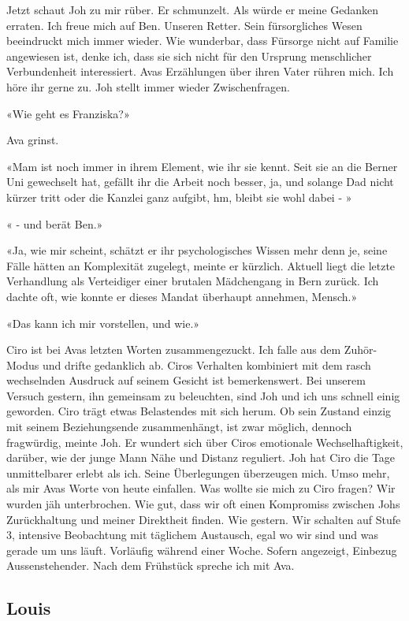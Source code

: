 \sectionbreak

Jetzt schaut Joh zu mir rüber. Er schmunzelt. Als würde er meine
Gedanken erraten.
Ich freue mich auf Ben. Unseren Retter. Sein fürsorgliches Wesen
beeindruckt mich immer wieder. Wie wunderbar, dass Fürsorge nicht auf
Familie angewiesen ist, denke ich, dass sie sich nicht für den Ursprung
menschlicher Verbundenheit interessiert.
Avas Erzählungen über ihren Vater rühren mich. Ich höre ihr gerne zu.
Joh stellt immer wieder Zwischenfragen.

«Wie geht es Franziska?»

Ava grinst.

«Mam ist noch immer in ihrem Element, wie ihr sie kennt. Seit sie an die
Berner Uni gewechselt hat, gefällt ihr die Arbeit noch besser, ja, und
solange Dad nicht kürzer tritt oder die Kanzlei ganz aufgibt, hm, bleibt
sie wohl dabei - »

« - und berät Ben.»

«Ja, wie mir scheint, schätzt er ihr psychologisches Wissen mehr denn
je, seine Fälle hätten an Komplexität zugelegt, meinte er kürzlich.
Aktuell liegt die letzte Verhandlung als Verteidiger einer brutalen
Mädchengang in Bern zurück. Ich dachte oft, wie konnte er dieses Mandat
überhaupt annehmen, Mensch.»

«Das kann ich mir vorstellen, und wie.»

Ciro ist bei Avas letzten Worten zusammengezuckt. Ich falle aus dem
Zuhör-Modus und drifte gedanklich ab. Ciros Verhalten kombiniert mit dem
rasch wechselnden Ausdruck auf seinem Gesicht ist bemerkenswert. Bei
unserem Versuch gestern, ihn gemeinsam zu beleuchten, sind Joh und ich
uns schnell einig geworden. Ciro trägt etwas Belastendes mit sich herum.
Ob sein Zustand einzig mit seinem Beziehungsende zusammenhängt, ist zwar
möglich, dennoch fragwürdig, meinte Joh. Er wundert sich über Ciros
emotionale Wechselhaftigkeit, darüber, wie der junge Mann Nähe und
Distanz reguliert. Joh hat Ciro die Tage unmittelbarer erlebt als ich.
Seine Überlegungen überzeugen mich. Umso mehr, als mir Avas Worte von
heute einfallen. Was wollte sie mich zu Ciro fragen? Wir wurden jäh
unterbrochen.
Wie gut, dass wir oft einen Kompromiss zwischen Johs Zurückhaltung und
meiner Direktheit finden. Wie gestern.
Wir schalten auf Stufe 3, intensive Beobachtung mit täglichem Austausch,
egal wo wir sind und was gerade um uns läuft. Vorläufig während einer
Woche. Sofern angezeigt, Einbezug Aussenstehender.
Nach dem Frühstück spreche ich mit Ava.


\subsection{Louis}

